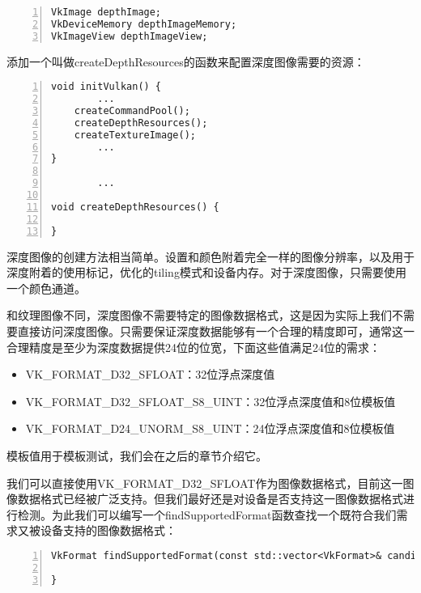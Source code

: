 \documentclass{ctexart}
\begin{document}
\begin{lstlisting}[language={[ANSI]C},keywordstyle=\color{blue!70},commentstyle=\color{red!50!green!50!blue!50},frame=shadowbox, rulesepcolor=\color{red!20!green!20!blue!20},basicstyle=\small,numbers=left, numberstyle=\tiny,breaklines=true]
VkImage depthImage;
VkDeviceMemory depthImageMemory;
VkImageView depthImageView;
\end{lstlisting}

添加一个叫做createDepthResources的函数来配置深度图像需要的资源：

\begin{lstlisting}[language={[ANSI]C},keywordstyle=\color{blue!70},commentstyle=\color{red!50!green!50!blue!50},frame=shadowbox, rulesepcolor=\color{red!20!green!20!blue!20},basicstyle=\small,numbers=left, numberstyle=\tiny,breaklines=true]
void initVulkan() {
		...
	createCommandPool();
	createDepthResources();
	createTextureImage();
		...
}

		...

void createDepthResources() {

}
\end{lstlisting}

深度图像的创建方法相当简单。设置和颜色附着完全一样的图像分辨率，以及用于深度附着的使用标记，优化的tiling模式和设备内存。对于深度图像，只需要使用一个颜色通道。

和纹理图像不同，深度图像不需要特定的图像数据格式，这是因为实际上我们不需要直接访问深度图像。只需要保证深度数据能够有一个合理的精度即可，通常这一合理精度是至少为深度数据提供24位的位宽，下面这些值满足24位的需求：

\begin{itemize}
	\item VK\_FORMAT\_D32\_SFLOAT：32位浮点深度值
	\item VK\_FORMAT\_D32\_SFLOAT\_S8\_UINT：32位浮点深度值和8位模板值
	\item VK\_FORMAT\_D24\_UNORM\_S8\_UINT：24位浮点深度值和8位模板值
\end{itemize}

模板值用于模板测试，我们会在之后的章节介绍它。

我们可以直接使用VK\_FORMAT\_D32\_SFLOAT作为图像数据格式，目前这一图像数据格式已经被广泛支持。但我们最好还是对设备是否支持这一图像数据格式进行检测。为此我们可以编写一个findSupportedFormat函数查找一个既符合我们需求又被设备支持的图像数据格式：

\begin{lstlisting}[language={[ANSI]C},keywordstyle=\color{blue!70},commentstyle=\color{red!50!green!50!blue!50},frame=shadowbox, rulesepcolor=\color{red!20!green!20!blue!20},basicstyle=\small,numbers=left, numberstyle=\tiny,breaklines=true]
VkFormat findSupportedFormat(const std::vector<VkFormat>& candidates, VkImageTiling tiling, VkFormatFeatureFlags features) {

}
\end{lstlisting}
\end{document}
